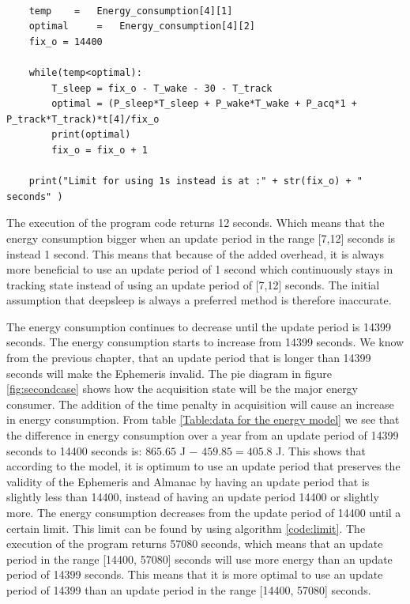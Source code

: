 \lstset{language=Python}          %
\begin{lstlisting}[frame=single, caption= Code used for finding the beneficial limit]  % Start your code-block

    temp    =   Energy_consumption[4][1]
    optimal     =   Energy_consumption[4][2]
    fix_o = 14400

    while(temp<optimal):  
        T_sleep = fix_o - T_wake - 30 - T_track
        optimal = (P_sleep*T_sleep + P_wake*T_wake + P_acq*1 + P_track*T_track)*t[4]/fix_o
        print(optimal)
        fix_o = fix_o + 1

    print("Limit for using 1s instead is at :" + str(fix_o) + " seconds" )
\end{lstlisting}
\label{code:limit}


The execution of the program code returns 12 seconds. Which means that the energy consumption bigger when an update period in the range [7,12] seconds is instead 1 second. This means that because of the added overhead, it is always more beneficial to use an update period of 1 second which continuously stays in tracking state instead of using an update period of [7,12] seconds. The initial assumption that deepsleep is always a preferred method is therefore inaccurate.

The energy consumption continues to decrease until the update period is 14399 seconds. The energy consumption starts to increase from 14399 seconds. We know from the previous chapter, that an update period that is longer than 14399 seconds will make the Ephemeris invalid. The pie diagram in figure \ref{fig:secondcase} shows how the acquisition state will be the major energy consumer. The addition of the time penalty in acquisition will cause an increase in energy consumption.  From table \ref{Table:data for the energy model} we see that the difference in energy consumption over a year from an update period of 14399 seconds to 14400 seconds is: $865.65$ J $-$ $459.85= 405.8$ J. This shows that according to the model, it is optimum to use an update period that preserves the validity of the Ephemeris and Almanac by having an update period that is slightly less than 14400, instead of having an update period 14400 or slightly more.  The energy consumption decreases from the update period of 14400 until a certain limit. This limit can be found by using algorithm \ref{code:limit}.  The execution of the program returns 57080 seconds, which means that an update period in the range [14400, 57080] seconds will use more energy than an update period of 14399 seconds.  This means that it is more optimal to use an update period of 14399 than an update period in the range [14400, 57080] seconds.

